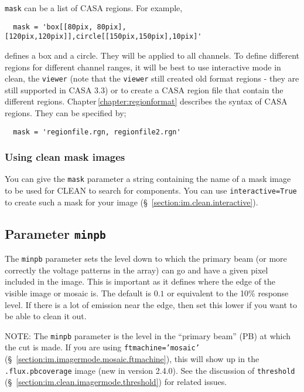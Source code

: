 {\tt mask} can be a list of CASA regions.  For example,
\small
\begin{verbatim}
  mask = 'box[[80pix, 80pix],[120pix,120pix]],circle[[150pix,150pix],10pix]'
\end{verbatim}
\normalsize defines a box and a circle. They will be applied to all
channels. To define different regions for different channel ranges, it
will be best to use interactive mode in clean, the {\tt viewer} (note
that the {\tt viewer} still created old format regions - they are
still supported in CASA 3.3) or to create a CASA region file that
contain the different regions. Chapter\,\ref{chapter:regionformat}
describes the syntax of CASA regions. They can be specified by;

\small
\begin{verbatim}
  mask = 'regionfile.rgn, regionfile2.rgn'
\end{verbatim}
\normalsize

\subsubsection{Using clean mask images}
\label{section:im.clean.mask.maskimage}

You can give the {\tt mask} parameter a string containing the
name of a mask image to be used for CLEAN to search for components.  
You can use {\tt interactive=True} to create such a mask for your image
(\S~\ref{section:im.clean.interactive}).



\subsection{Parameter {\tt minpb} }
\label{section:im.clean.minpb}

The {\tt minpb} parameter sets the level down to which the primary
beam (or more correctly the voltage patterns in the array) can go and
have a given pixel included in the image.  This is important as it
defines where the edge of the visible image or mosaic is. 
The default is $0.1$ or
equivalent to the 10\% response level.  If there is a lot of emission
near the edge, then set this lower if you want to be
able to clean it out.

NOTE: The {\tt minpb} parameter is the level in the ``primary beam''
(PB) at which the cut is made.  If you are using {\tt ftmachine='mosaic'}
(\S~\ref{section:im.imagermode.mosaic.ftmachine}), this will show
up in the {\tt .flux.pbcoverage} image (new in version 2.4.0).
See the discussion of {\tt threshold} 
(\S~\ref{section:im.clean.imagermode.threshold}) for related issues.

